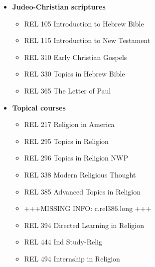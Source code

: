 \documentclass[
  letterpaper,
]{scrbook}
\providecommand{\tightlist}{%
  \setlength{\itemsep}{0pt}\setlength{\parskip}{0pt}}
\begin{document}
\begin{itemize}
\tightlist
\item
  \textbf{Judeo-Christian scriptures}

  \begin{itemize}
  \tightlist
  \item
    REL 105 Introduction to Hebrew Bible
  \item
    REL 115 Introduction to New Testament
  \item
    REL 310 Early Christian Gospels
  \item
    REL 330 Topics in Hebrew Bible
  \item
    REL 365 The Letter of Paul
  \end{itemize}
\item
  \textbf{Topical courses}

  \begin{itemize}
  \tightlist
  \item
    REL 217 Religion in America
  \item
    REL 295 Topics in Religion
  \item
    REL 296 Topics in Religion NWP
  \item
    REL 338 Modern Religious Thought
  \item
    REL 385 Advanced Topics in Religion
  \item
    +++MISSING INFO: c.rel386.long +++
  \item
    REL 394 Directed Learning in Religion
  \item
    REL 444 Ind Study-Relig
  \item
    REL 494 Internship in Religion
  \end{itemize}
\end{itemize}
\end{document}
